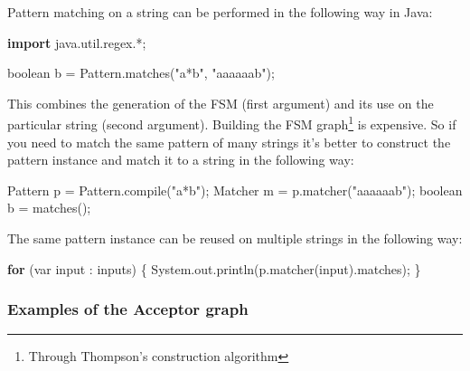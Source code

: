 \documentclass[
]{book}
\newenvironment{Shaded}{\begin{snugshade}}{\end{snugshade}}
\newcommand{\BuiltInTok}[1]{#1}
\newcommand{\DataTypeTok}[1]{\textcolor[rgb]{0.13,0.29,0.53}{#1}}
\newcommand{\FunctionTok}[1]{\textcolor[rgb]{0.00,0.00,0.00}{#1}}
\newcommand{\ImportTok}[1]{#1}
\newcommand{\KeywordTok}[1]{\textcolor[rgb]{0.13,0.29,0.53}{\textbf{#1}}}
\newcommand{\NormalTok}[1]{#1}
\newcommand{\StringTok}[1]{\textcolor[rgb]{0.31,0.60,0.02}{#1}}
\begin{document}
Pattern matching on a string can be performed in the following way in Java:

\begin{Shaded}
\begin{Highlighting}[]
\KeywordTok{import}\ImportTok{ java.util.regex.*;}

\DataTypeTok{boolean}\NormalTok{ b = }\BuiltInTok{Pattern}\NormalTok{.}\FunctionTok{matches}\NormalTok{(}\StringTok{"a*b"}\NormalTok{, }\StringTok{"aaaaaab"}\NormalTok{);}
\end{Highlighting}
\end{Shaded}

This combines the generation of the FSM (first argument) and its use on the particular string (second argument). Building the FSM graph\footnote{Through Thompson's construction algorithm} is expensive. So if you need to match the same pattern of many strings it's better to construct the pattern instance and match it to a string in the following way:

\begin{Shaded}
\begin{Highlighting}[]
\BuiltInTok{Pattern}\NormalTok{ p = }\BuiltInTok{Pattern}\NormalTok{.}\FunctionTok{compile}\NormalTok{(}\StringTok{"a*b"}\NormalTok{);}
\BuiltInTok{Matcher}\NormalTok{ m = p.}\FunctionTok{matcher}\NormalTok{(}\StringTok{"aaaaaab"}\NormalTok{);}
\DataTypeTok{boolean}\NormalTok{ b = }\FunctionTok{matches}\NormalTok{();}
\end{Highlighting}
\end{Shaded}

The same pattern instance can be reused on multiple strings in the following way:

\begin{Shaded}
\begin{Highlighting}[]
\KeywordTok{for}\NormalTok{ (var input : inputs) \{}
  \BuiltInTok{System}\NormalTok{.}\FunctionTok{out}\NormalTok{.}\FunctionTok{println}\NormalTok{(p.}\FunctionTok{matcher}\NormalTok{(input).}\FunctionTok{matches}\NormalTok{);}
\NormalTok{\}}
\end{Highlighting}
\end{Shaded}

\hypertarget{examples-of-the-acceptor-graph}{%
\subsubsection{Examples of the Acceptor graph}\label{examples-of-the-acceptor-graph}}
\end{document}
